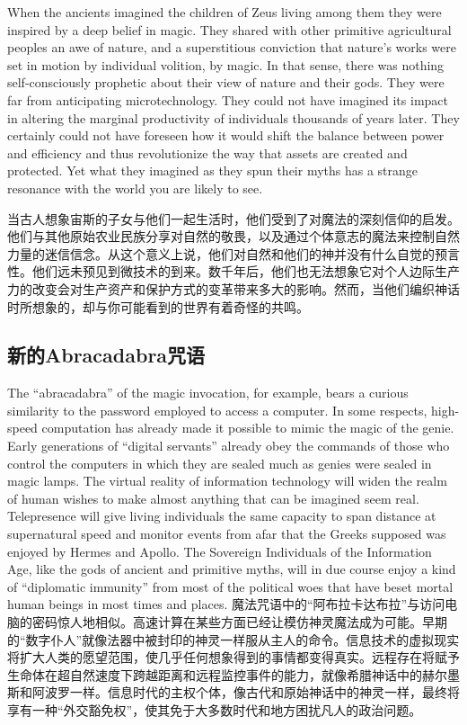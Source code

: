 \begin{Parallel}{97mm}{45mm}
  \ParallelPar  
  \ParallelLText
  {When the ancients imagined the children of Zeus living among them they were inspired by a deep belief in magic. They shared with other primitive agricultural peoples an awe of nature, and a superstitious conviction that nature's works were set in motion by individual volition, by magic. In that sense, there was nothing self-consciously prophetic about their view of nature and their gods. They were far from anticipating microtechnology. They could not have imagined its impact in altering the marginal productivity of individuals thousands of years later. They certainly could not have foreseen how it would shift the balance between power and efficiency and thus revolutionize the way that assets are created and protected. Yet what they imagined as they spun their myths has a strange resonance with the world you are likely to see. }
  
  \ParallelRText
  {\small 当古人想象宙斯的子女与他们一起生活时，他们受到了对魔法的深刻信仰的启发。他们与其他原始农业民族分享对自然的敬畏，以及通过个体意志的魔法来控制自然力量的迷信信念。从这个意义上说，他们对自然和他们的神并没有什么自觉的预言性。他们远未预见到微技术的到来。数千年后，他们也无法想象它对个人边际生产力的改变会对生产资产和保护方式的变革带来多大的影响。然而，当他们编织神话时所想象的，却与你可能看到的世界有着奇怪的共鸣。 }
  \ParallelPar

\subsection{新的Abracadabra咒语}
 
  \ParallelLText
  {The “abracadabra” of the magic invocation, for example, bears a curious similarity to the password employed to access a computer. In some respects, high-speed computation has already made it possible to mimic the magic of the genie. Early generations of “digital servants” already obey the commands of those who control the computers in which they are sealed much as genies were sealed in magic lamps. The virtual reality of information technology will widen the realm of human wishes to make almost anything that can be imagined seem real. Telepresence will give living individuals the same capacity to span distance at supernatural speed and monitor events from afar that the Greeks supposed was enjoyed by Hermes and Apollo. The Sovereign Individuals of the Information Age, like the gods of ancient and primitive myths, will in due course enjoy a kind of “diplomatic immunity” from most of the political woes that have beset mortal human beings in most times and places. }  
  \ParallelRText
  {\small 魔法咒语中的“阿布拉卡达布拉”与访问电脑的密码惊人地相似。高速计算在某些方面已经让模仿神灵魔法成为可能。早期的“数字仆人”就像法器中被封印的神灵一样服从主人的命令。信息技术的虚拟现实将扩大人类的愿望范围，使几乎任何想象得到的事情都变得真实。远程存在将赋予生命体在超自然速度下跨越距离和远程监控事件的能力，就像希腊神话中的赫尔墨斯和阿波罗一样。信息时代的主权个体，像古代和原始神话中的神灵一样，最终将享有一种“外交豁免权”，使其免于大多数时代和地方困扰凡人的政治问题。}


\end{Parallel}
